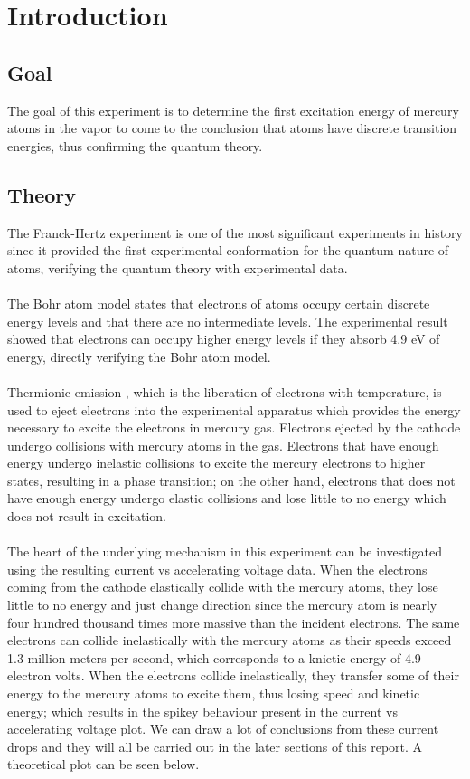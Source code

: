 \section{Introduction}

	\subsection{Goal}
		The goal of this experiment is to determine the first excitation energy of mercury atoms in the vapor to come to the conclusion that atoms have discrete transition energies, thus confirming the quantum theory.
	
	\subsection{Theory}
		The Franck-Hertz experiment is one of the most significant experiments in history since it provided the first experimental conformation for the quantum nature of atoms, verifying the quantum theory with experimental data.
		\\
		\\
		The Bohr atom model states that electrons of atoms occupy certain discrete energy levels and that there are no intermediate levels. The experimental result showed that electrons can occupy higher energy levels if they absorb 4.9 eV of energy, directly verifying the Bohr atom model.
		\\
		\\
		Thermionic emission , which is the liberation of electrons with temperature, is used to eject electrons into the experimental apparatus which provides the energy necessary to excite the electrons in mercury gas. Electrons ejected by the cathode undergo collisions with mercury atoms in the gas. Electrons that have enough energy undergo inelastic collisions to excite the mercury electrons to higher states, resulting in a phase transition; on the other hand, electrons that does not have enough energy undergo elastic collisions and lose little to no energy which does not result in excitation.
		\\
		\\
		The heart of the underlying mechanism in this experiment can be investigated using the resulting current vs accelerating voltage data. When the electrons coming from the cathode elastically collide with the mercury atoms, they lose little to no energy and just change direction since the mercury atom is nearly four hundred thousand times more massive than the incident electrons. The same electrons can collide inelastically with the mercury atoms as their speeds exceed 1.3 million meters per second, which corresponds to a knietic energy of 4.9 electron volts. When the electrons collide inelastically, they transfer some of their energy to the mercury atoms to excite them, thus losing speed and kinetic energy; which results in the spikey behaviour present in the current vs accelerating voltage plot. We can draw a lot of conclusions from these current drops and they will all be carried out in the later sections of this report. A theoretical plot can be seen below.
		
